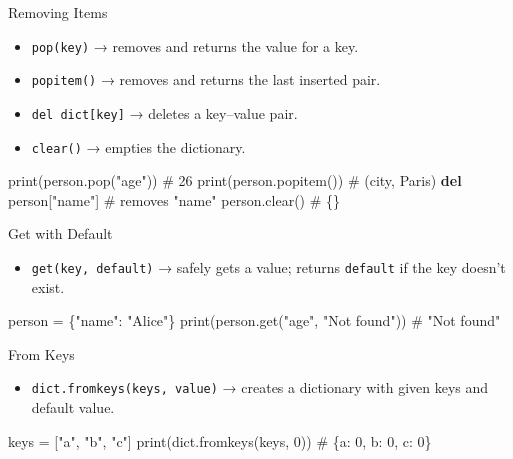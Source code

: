 \documentclass[
  letterpaper,
  DIV=11,
  numbers=noendperiod]{scrreprt}
\newenvironment{Shaded}{\begin{snugshade}}{\end{snugshade}}
\newcommand{\BuiltInTok}[1]{\textcolor[rgb]{0.00,0.23,0.31}{#1}}
\newcommand{\CommentTok}[1]{\textcolor[rgb]{0.37,0.37,0.37}{#1}}
\newcommand{\DecValTok}[1]{\textcolor[rgb]{0.68,0.00,0.00}{#1}}
\newcommand{\KeywordTok}[1]{\textcolor[rgb]{0.00,0.23,0.31}{\textbf{#1}}}
\newcommand{\NormalTok}[1]{\textcolor[rgb]{0.00,0.23,0.31}{#1}}
\newcommand{\OperatorTok}[1]{\textcolor[rgb]{0.37,0.37,0.37}{#1}}
\newcommand{\StringTok}[1]{\textcolor[rgb]{0.13,0.47,0.30}{#1}}
\providecommand{\tightlist}{%
  \setlength{\itemsep}{0pt}\setlength{\parskip}{0pt}}
\begin{document}
Removing Items

\begin{itemize}
\tightlist
\item
  \texttt{pop(key)} → removes and returns the value for a key.
\item
  \texttt{popitem()} → removes and returns the last inserted pair.
\item
  \texttt{del\ dict{[}key{]}} → deletes a key--value pair.
\item
  \texttt{clear()} → empties the dictionary.
\end{itemize}

\begin{Shaded}
\begin{Highlighting}[]
\BuiltInTok{print}\NormalTok{(person.pop(}\StringTok{"age"}\NormalTok{))     }\CommentTok{\# 26}
\BuiltInTok{print}\NormalTok{(person.popitem())      }\CommentTok{\# (\textquotesingle{}city\textquotesingle{}, \textquotesingle{}Paris\textquotesingle{})}
\KeywordTok{del}\NormalTok{ person[}\StringTok{"name"}\NormalTok{]           }\CommentTok{\# removes "name"}
\NormalTok{person.clear()               }\CommentTok{\# \{\}}
\end{Highlighting}
\end{Shaded}

Get with Default

\begin{itemize}
\tightlist
\item
  \texttt{get(key,\ default)} → safely gets a value; returns
  \texttt{default} if the key doesn't exist.
\end{itemize}

\begin{Shaded}
\begin{Highlighting}[]
\NormalTok{person }\OperatorTok{=}\NormalTok{ \{}\StringTok{"name"}\NormalTok{: }\StringTok{"Alice"}\NormalTok{\}}
\BuiltInTok{print}\NormalTok{(person.get(}\StringTok{"age"}\NormalTok{, }\StringTok{"Not found"}\NormalTok{))  }\CommentTok{\# "Not found"}
\end{Highlighting}
\end{Shaded}

From Keys

\begin{itemize}
\tightlist
\item
  \texttt{dict.fromkeys(keys,\ value)} → creates a dictionary with given
  keys and default value.
\end{itemize}

\begin{Shaded}
\begin{Highlighting}[]
\NormalTok{keys }\OperatorTok{=}\NormalTok{ [}\StringTok{"a"}\NormalTok{, }\StringTok{"b"}\NormalTok{, }\StringTok{"c"}\NormalTok{]}
\BuiltInTok{print}\NormalTok{(}\BuiltInTok{dict}\NormalTok{.fromkeys(keys, }\DecValTok{0}\NormalTok{))   }\CommentTok{\# \{\textquotesingle{}a\textquotesingle{}: 0, \textquotesingle{}b\textquotesingle{}: 0, \textquotesingle{}c\textquotesingle{}: 0\}}
\end{Highlighting}
\end{Shaded}
\end{document}
